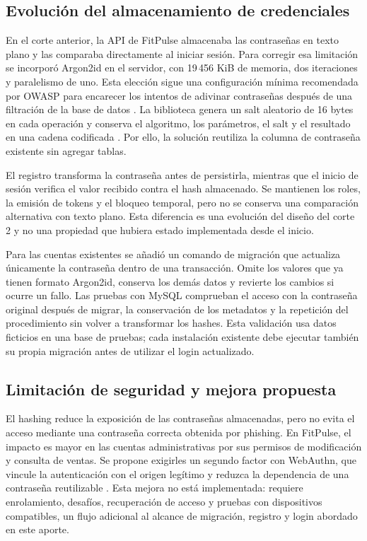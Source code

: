\subsection{Evolución del almacenamiento de credenciales}

En el corte anterior, la API de FitPulse almacenaba las contraseñas en texto plano y las comparaba directamente al iniciar sesión. Para corregir esa limitación se incorporó Argon2id en el servidor, con 19\,456 KiB de memoria, dos iteraciones y paralelismo de uno. Esta elección sigue una configuración mínima recomendada por OWASP para encarecer los intentos de adivinar contraseñas después de una filtración de la base de datos \cite{owaspPasswordStorage}. La biblioteca genera un salt aleatorio de 16 bytes en cada operación y conserva el algoritmo, los parámetros, el salt y el resultado en una cadena codificada \cite{nodeArgon2}. Por ello, la solución reutiliza la columna de contraseña existente sin agregar tablas.

El registro transforma la contraseña antes de persistirla, mientras que el inicio de sesión verifica el valor recibido contra el hash almacenado. Se mantienen los roles, la emisión de tokens y el bloqueo temporal, pero no se conserva una comparación alternativa con texto plano. Esta diferencia es una evolución del diseño del corte 2 y no una propiedad que hubiera estado implementada desde el inicio.

Para las cuentas existentes se añadió un comando de migración que actualiza únicamente la contraseña dentro de una transacción. Omite los valores que ya tienen formato Argon2id, conserva los demás datos y revierte los cambios si ocurre un fallo. Las pruebas con MySQL comprueban el acceso con la contraseña original después de migrar, la conservación de los metadatos y la repetición del procedimiento sin volver a transformar los hashes. Esta validación usa datos ficticios en una base de pruebas; cada instalación existente debe ejecutar también su propia migración antes de utilizar el login actualizado.

\subsection{Limitación de seguridad y mejora propuesta}

El hashing reduce la exposición de las contraseñas almacenadas, pero no evita el acceso mediante una contraseña correcta obtenida por phishing. En FitPulse, el impacto es mayor en las cuentas administrativas por sus permisos de modificación y consulta de ventas. Se propone exigirles un segundo factor con WebAuthn, que vincule la autenticación con el origen legítimo y reduzca la dependencia de una contraseña reutilizable \cite{owaspMultifactor}. Esta mejora no está implementada: requiere enrolamiento, desafíos, recuperación de acceso y pruebas con dispositivos compatibles, un flujo adicional al alcance de migración, registro y login abordado en este aporte.
